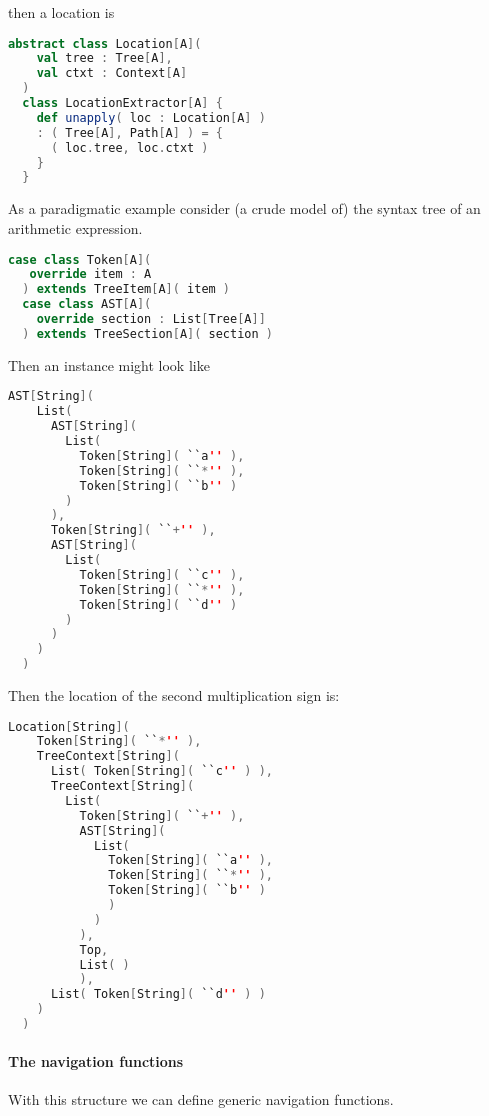 then a location is

\begin{lstlisting}[language=Scala,mathescape=true]
  abstract class Location[A](
    val tree : Tree[A],
    val ctxt : Context[A]
  )
  class LocationExtractor[A] {
    def unapply( loc : Location[A] )
    : ( Tree[A], Path[A] ) = {
      ( loc.tree, loc.ctxt )
    }
  }  
\end{lstlisting}

As a paradigmatic example consider (a crude model of) the syntax tree
of an arithmetic expression.

\begin{lstlisting}[language=Scala,mathescape=true]
  case class Token[A](
   override item : A
  ) extends TreeItem[A]( item )
  case class AST[A](
    override section : List[Tree[A]]
  ) extends TreeSection[A]( section )
\end{lstlisting}

Then an instance might look like

\break

\begin{lstlisting}[language=Scala,mathescape=true]
  AST[String](
    List(
      AST[String](
        List(
          Token[String]( ``a'' ),
          Token[String]( ``*'' ),
          Token[String]( ``b'' )
        )
      ),
      Token[String]( ``+'' ),
      AST[String](
        List(
          Token[String]( ``c'' ),
          Token[String]( ``*'' ),
          Token[String]( ``d'' )
        )
      )
    )
  )
\end{lstlisting}

Then the location of the second multiplication sign is:

\begin{lstlisting}[language=Scala,mathescape=true]
  Location[String](
    Token[String]( ``*'' ),
    TreeContext[String](
      List( Token[String]( ``c'' ) ),
      TreeContext[String](
        List(
          Token[String]( ``+'' ),
          AST[String](
            List(
              Token[String]( ``a'' ),
              Token[String]( ``*'' ),
              Token[String]( ``b'' )
              )
            )
          ),
          Top,
          List( )
          ),
      List( Token[String]( ``d'' ) )
    )
  )
\end{lstlisting}

\paragraph{The navigation functions} With this structure we can define
generic navigation functions.

